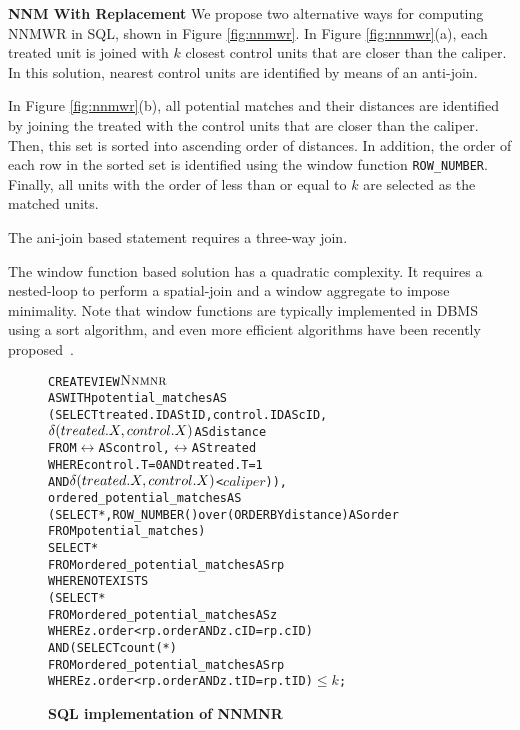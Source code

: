 {\bf NNM With Replacement}
We propose two alternative ways for computing  NNMWR in SQL, shown in
Figure \ref{fig:nnmwr}. In Figure \ref{fig:nnmwr}(a), each treated unit is joined with $k$ closest control units that are closer than the caliper. In this solution, nearest control units are identified by means of an anti-join.   In Figure \ref{fig:nnmwr}(b), all potential matches and their distances are identified by
joining the treated with the control units that are closer than
the caliper. Then, this set is sorted into ascending order of
distances.  In addition, the order of each row in the sorted set is identified
using the window function {\verb|ROW_NUMBER|}. Finally, all units with the order of less than or equal to $k$ are selected as the matched units.


The ani-join based statement requires a three-way join.  The window function based
solution has a quadratic complexity. It requires a nested-loop to
perform a spatial-join and a window aggregate to impose
minimality. Note that window functions are typically implemented in
DBMS using a sort algorithm, and even more efficient algorithms have
been recently proposed~\cite{Neumann15}.






\begin{figure}
  \centering
\begin{alltt} \scriptsize
CREATE VIEW \(\nnmnr\)
AS WITH potential_matches AS
  (SELECT treated.ID AS tID, control.ID AS cID,
          \(\delta(treated.\cv,control.\cv)\)  AS distance
   FROM \(\rel\) AS control, \(\rel\) AS treated
   WHERE control.T=0 AND treated.T=1
     AND \(\delta(treated.\cv,control.\cv)\) < \(caliper\))),
            ordered_potential_matches AS
  (SELECT *, ROW_NUMBER() over (ORDER BY distance) AS order
   FROM potential_matches)
SELECT *
FROM ordered_potential_matches AS rp
WHERE NOT EXISTS
    (SELECT *
     FROM ordered_potential_matches AS z
     WHERE z.order < rp.order AND z.cID=rp.cID)
  AND (SELECT count(*)
     FROM ordered_potential_matches AS rp
     WHERE z.order < rp.order AND z.tID=rp.tID)\( \leq k\);
\end{alltt} \vspace{-.5cm}
  \caption{\bf SQL implementation of NNMNR}\label{fig:nnmnr}
\end{figure}


